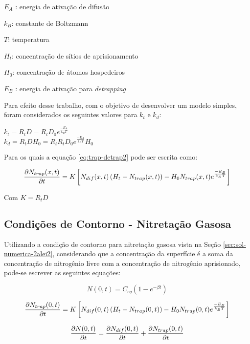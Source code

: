 $E_A$ : energia de ativação de difusão

$k_B$: constante de Boltzmann 
	
$T$: temperatura

$H_t$: concentração de sítios de aprisionamento

$H_0$: concentração de átomos hospedeiros
	
$E_B$ : energia de ativação para \textit{detrapping}

Para efeito desse trabalho, com o objetivo de desenvolver um modelo simples, foram considerados os seguintes valores para $k_t$ e $k_d$:
\begin{center}
$k_t = R_tD = R_tD_0e^{\frac{-E_A}{k_BT}}$ \\ $k_d = R_tDH_0 = R_tR_tD_0e^{\frac{-E_A}{k_BT}}H_0$
\end{center}

Para os quais a equação \ref{eq:trap-detrap2} pode ser escrita como:

\begin{equation}
\label{eq:trap-detrap2-me}
\pdv{N_{trap}(x,t)}{t} = K\left[N_{dif}(x,t)\left(H_t-N_{trap}(x,t)\right) - H_0 N_{trap}(x,t)e^{\frac{-E_B}{k_BT}}\right] 
\end{equation}

Com $K=R_tD$

\subsection{Condições de Contorno - Nitretação Gasosa}
\label{sec:trap-detrap-gas-cc}
Utilizando a condição de contorno para nitretação gasosa vista na Seção \ref{sec:sol-numerica-2alei2}, considerando que a concentração da superfície é a soma da concentração de nitrogênio livre com a concentração de nitrogênio aprisionado, pode-se escrever as seguintes equações:

\begin{equation}
\label{eq:trap-detrap-gas-cc1}
N(0,t) = C_{eq}(1 - e^{-\beta t})
\end{equation}

\begin{equation}
\label{eq:trap-detrap-gas-cc2}
\pdv{N_{trap}(0,t)}{t} = K\left[N_{dif}(0,t)\left(H_t-N_{trap}(0,t)\right) - H_0 N_{trap}(0,t)e^{\frac{-E_B}{k_BT}}\right] 
\end{equation}

\begin{equation}
\label{eq:trap-detrap-gas-cc3}
\pdv{N(0,t)}{t} = \pdv{N_{dif}(0,t)}{t} + \pdv{N_{trap}(0,t)}{t}
\end{equation}

